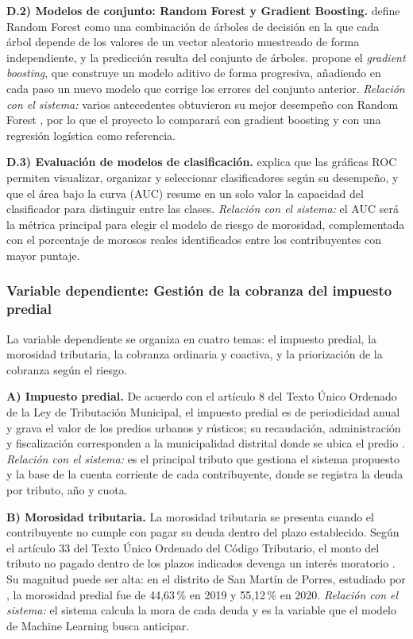 \documentclass[12pt,a4paper]{report}
\begin{document}
\noindent\textbf{D.2) Modelos de conjunto: Random Forest y Gradient Boosting.} \textcite{breiman2001} define Random Forest como una combinación de árboles de decisión en la que cada árbol depende de los valores de un vector aleatorio muestreado de forma independiente, y la predicción resulta del conjunto de árboles. \textcite{friedman2001} propone el \textit{gradient boosting}, que construye un modelo aditivo de forma progresiva, añadiendo en cada paso un nuevo modelo que corrige los errores del conjunto anterior. \textit{Relación con el sistema:} varios antecedentes obtuvieron su mejor desempeño con Random Forest \parencite{ippolito2020,orozco2023,sifani2025}, por lo que el proyecto lo comparará con gradient boosting y con una regresión logística como referencia.

\noindent\textbf{D.3) Evaluación de modelos de clasificación.} \textcite{fawcett2006} explica que las gráficas ROC permiten visualizar, organizar y seleccionar clasificadores según su desempeño, y que el área bajo la curva (AUC) resume en un solo valor la capacidad del clasificador para distinguir entre las clases. \textit{Relación con el sistema:} el AUC será la métrica principal para elegir el modelo de riesgo de morosidad, complementada con el porcentaje de morosos reales identificados entre los contribuyentes con mayor puntaje.

\subsubsection{Variable dependiente: Gestión de la cobranza del impuesto predial}

La variable dependiente se organiza en cuatro temas: el impuesto predial, la morosidad tributaria, la cobranza ordinaria y coactiva, y la priorización de la cobranza según el riesgo.

\noindent\textbf{A) Impuesto predial.} De acuerdo con el artículo 8 del Texto Único Ordenado de la Ley de Tributación Municipal, el impuesto predial es de periodicidad anual y grava el valor de los predios urbanos y rústicos; su recaudación, administración y fiscalización corresponden a la municipalidad distrital donde se ubica el predio \parencite{tuoltm}. \textit{Relación con el sistema:} es el principal tributo que gestiona el sistema propuesto y la base de la cuenta corriente de cada contribuyente, donde se registra la deuda por tributo, año y cuota.

\noindent\textbf{B) Morosidad tributaria.} La morosidad tributaria se presenta cuando el contribuyente no cumple con pagar su deuda dentro del plazo establecido. Según el artículo 33 del Texto Único Ordenado del Código Tributario, el monto del tributo no pagado dentro de los plazos indicados devenga un interés moratorio \parencite{codigotributario}. Su magnitud puede ser alta: en el distrito de San Martín de Porres, estudiado por \textcite{paredes2022}, la morosidad predial fue de 44,63\,\% en 2019 y 55,12\,\% en 2020. \textit{Relación con el sistema:} el sistema calcula la mora de cada deuda y es la variable que el modelo de Machine Learning busca anticipar.
\end{document}
